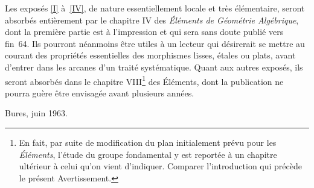 Les expos\'es \ref{I} \`a~\ref{IV}, de nature essentiellement locale et
tr\`es \'el\'ementaire, seront absorb\'es enti\`erement par
le chapitre IV des \emph{Éléments de Géométrie
Algébrique}, dont la premi\`ere partie est \`a l'impression et
qui sera sans doute publi\'e vers fin~64. Ils pourront n\'eanmoins
\^etre utiles \`a un lecteur qui d\'esirerait se mettre au
courant des propri\'et\'es essentielles des morphismes lisses,
\'etales ou plats, avant d'entrer dans les arcanes d'un trait\'e
syst\'ematique. Quant aux autres expos\'es, ils seront
absorb\'es dans le chapitre VIII\footnote{En fait, par suite de
modification du plan initialement pr\'evu pour les
\emph{Éléments}, l'\'etude du groupe fondamental y est
report\'ee \`a un chapitre ult\'erieur \`a celui qu'on vient
d'indiquer. Comparer l'introduction qui pr\'ec\`ede le pr\'esent
\og Avertissement\fg.} des \og \'El\'ements\fg, dont la publication ne
pourra gu\`ere \^etre envisag\'ee avant plusieurs ann\'ees.

\bigskip\hfill Bures, juin 1963.





